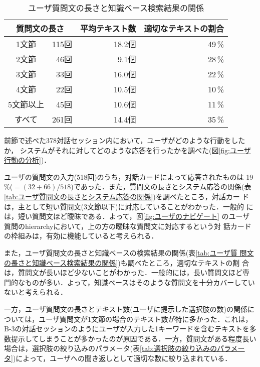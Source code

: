 \begin{table}
 \caption{ユーザ質問文の長さと知識ベース検索結果の関係} 
\label{tab:ユーザ質問文の長さと知識ベース検索結果の関係}
 \begin{center}

  \small
  \begin{tabular}{c@{(}r@{)}|r|r} \hline
   \multicolumn{2}{c|}{質問文の長さ} &   平均テキスト数 &   適切なテキストの割合 \\ \hline
   1文節     & 115回 & 18.2個 & 49\,\% \\
   2文節     &  46回 &  9.1個 & 28\,\% \\
   3文節     &  33回 & 16.0個 & 22\,\% \\
   4文節     &  22回 & 10.5個 & 10\,\% \\
   5文節以上 &  45回 & 10.6個 & 11\,\% \\ \hline
   すべて    & 261回 & 14.4個 & 35\,\% \\ \hline
  \end{tabular}
 \end{center}
\end{table}



前節で述べた378対話セッション内において，ユーザがどのような行動をしたか，
システムがそれに対してどのような応答を行ったかを調べた(図\ref{fig:ユーザ
行動の分析})．

ユーザの質問文の入力(518回)のうち，対話カードによって応答されたものは
19\,\%($=(32+66)/518$)であった．また，質問文の長さとシステム応答の関係(表
\ref{tab:ユーザ質問文の長さとシステム応答の関係})を調べたところ，対話カー
ドは，主として短い質問文(3文節以下)に対応していることがわかった．一般的
には，短い質問文ほど曖昧である．よって，図\ref{fig:ユーザのナビゲート} 
のユーザ質問のhierarchyにおいて，上の方の曖昧な質問文に対応するという対
話カードの枠組みは，有効に機能していると考えられる．

また，ユーザ質問文の長さと知識ベースの検索結果の関係(表\ref{tab:ユーザ質
問文の長さと知識ベース検索結果の関係})も調べたところ，適切なテキストの割
合は，質問文が長いほど少ないことがわかった．一般的には，長い質問文ほど専
門的なものが多い．よって，知識ベースはそのような質問文を十分カバーしてい
ないと考えられる．

一方，ユーザ質問文の長さとテキスト数(ユーザに提示した選択肢の数)の関係に
ついては，ユーザ質問文が1文節の場合のテキスト数が特に多かった．これは，
B-3の対話セッションのようにユーザが入力した1キーワードを含むテキストを多
数提示してしまうことが多かったのが原因である．一方，質問文がある程度長い
場合は，選択肢の絞り込みのパラメータ(表\ref{tab:選択肢の絞り込みのパラメー
タ})によって，ユーザへの聞き返しとして適切な数に絞り込まれている．


